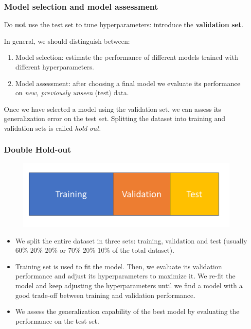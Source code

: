 \documentclass{beamer}
\begin{document}
	\begin{frame}
		\frametitle{Model selection and model assessment}
		
		Do \textbf{not} use the test set to tune hyperparameters: introduce the \textbf{validation set}.
		
		\vspace{5mm}
		
		In general, we should distinguish between:
		\begin{enumerate}
		\item Model selection: estimate the performance of different models trained with different hyperparameters. 
		\item Model assessment: after choosing a final model we evaluate its performance on \textsl{new, previously unseen} (test) data.
		\end{enumerate}
		
		\vspace{5mm}
		
		Once we have selected a model using the validation set, we can assess its generalization error on the test set. Splitting the dataset into training and validation sets is called \textit{hold-out}.
	\end{frame}

	\begin{frame}
		\frametitle{Double Hold-out}
		\begin{figure}
			\centering
			\includegraphics[scale=0.3]{images/hold-out}
		\end{figure}
		\begin{itemize}
			\item We split the entire dataset in three sets: training, validation and test (usually 60\%-20\%-20\% or  70\%-20\%-10\% of the total dataset). 
			\item Training set is used to fit the model. Then, we evaluate its validation performance and adjust its hyperparameters to maximize it. We re-fit the model and keep adjusting the hyperparameters until we find a model with a good trade-off between training and validation performance.
			\item We assess the generalization capability of the best model by evaluating the performance on the test set.
		\end{itemize}	
	\end{frame}
\end{document}
